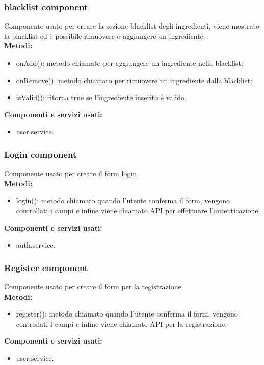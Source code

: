 \subsubsection{blacklist component}
Componente usato per creare la sezione blacklist degli ingredienti, viene mostrato la blacklist ed è possibile rimuovere o aggiungere un ingrediente.\\
\textbf{Metodi:}
\begin{itemize}
    \item onAdd(): metodo chiamato per aggiungere un ingrediente nella blacklist;
    \item onRemove(): metodo chiamato per rimuovere un ingrediente dalla blacklist;
    \item isValid(): ritorna true se l'ingrediente inserito è valido.
\end{itemize}
\textbf{Componenti e servizi usati:}
\begin{itemize}
    \item user.service.
\end{itemize}

\subsubsection{Login component}
Componente usato per creare il form login.\\
\textbf{Metodi:}
\begin{itemize}
    \item login(): metodo chiamato quando l'utente conferma il form, vengono controllati i campi e infine viene chiamato API per effettuare l'autenticazione.
\end{itemize}
\textbf{Componenti e servizi usati:}
\begin{itemize}
    \item auth.service.
\end{itemize}

\subsubsection{Register component}
Componente usato per creare il form per la registrazione.\\
\textbf{Metodi:}
\begin{itemize}
    \item register(): metodo chiamato quando l'utente conferma il form, vengono controllati i campi e infine viene chiamato API per la registrazione.
\end{itemize}
\textbf{Componenti e servizi usati:}
\begin{itemize}
    \item user.service.
\end{itemize}

